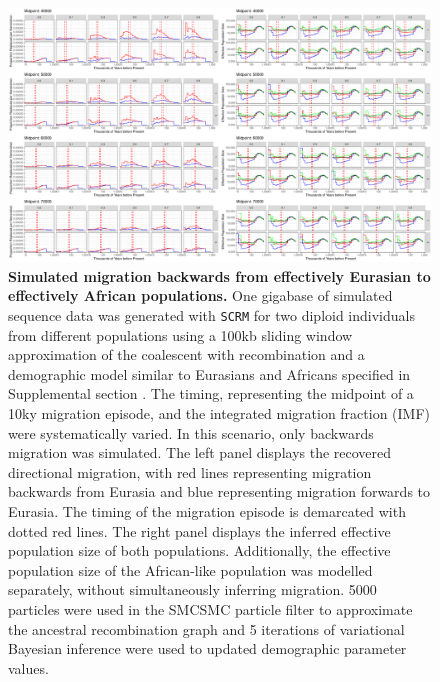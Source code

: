 \begin{figure}
	\centering
	\includegraphics[width=\textwidth]{plot/backward_different_starts.pdf}
	\caption[Simulated migration backwards from effectively Eurasian to effectively African populations]{{\bf Simulated migration backwards from effectively Eurasian to effectively African populations.} One gigabase of simulated sequence data was generated with {\tt SCRM} for two diploid individuals from different populations using a 100kb sliding window approximation of the coalescent with recombination and a demographic model similar to Eurasians and Africans specified in Supplemental section . The timing, representing the midpoint of a 10ky migration episode, and the integrated migration fraction (IMF) were systematically varied. In this scenario, only backwards migration was simulated. The left panel displays the recovered directional migration, with red lines representing migration backwards from Eurasia and blue representing migration forwards to Eurasia. The timing of the migration episode is demarcated with dotted red lines. The right panel displays the inferred effective population size of both populations. Additionally, the effective population size of the African-like population was modelled separately, without simultaneously inferring migration. 5000 particles were used in the SMCSMC particle filter to approximate the ancestral recombination graph and 5 iterations of variational Bayesian inference were used to updated demographic parameter values.}
	\label{fig:backsim}
\end{figure}

